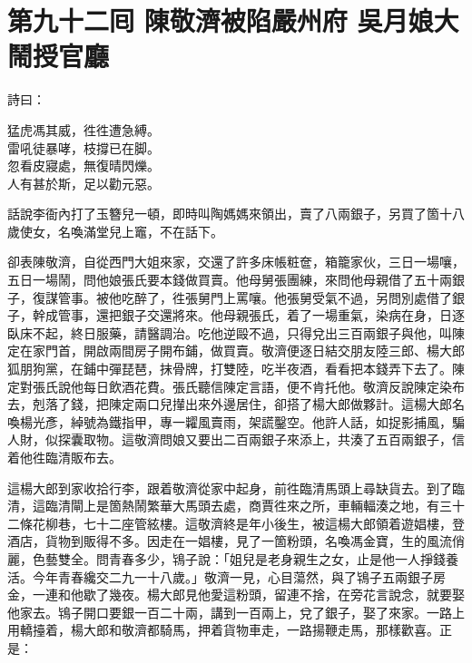 
\chapter*{第九十二囘 陳敬濟被陷嚴州府 吳月娘大鬧授官廳}


詩曰：

\begin{myquote}
猛虎馮其威，徃徃遭急縛。\\雷吼徒暴哮，枝撐已在脚。\\忽看皮寢處，無復晴閃爍。\\人有甚於斯，足以勸元惡。
\end{myquote}

話說李衙內打了玉簪兒一頓，即時叫陶媽媽來領出，賣了八兩銀子，另買了箇十八歲使女，名喚滿堂兒上竈，不在話下。

卻表陳敬濟，自從西門大姐來家，交還了許多床帳粧奩，箱籠家伙，三日一場嚷，五日一場鬧，問他娘張氏要本錢做買賣。他母舅張團練，來問他母親借了五十兩銀子，復謀管事。被他吃醉了，徃張舅門上罵嚷。{}他張舅受氣不過，另問別處借了銀子，幹成管事，還把銀子交還將來。他母親張氏，着了一場重氣，染病在身，日逐臥床不起，終日服藥，請醫調治。吃他逆毆不過，只得兌出三百兩銀子與他，叫陳定在家門首，開啟兩間房子開布鋪，做買賣。敬濟便逐日結交朋友陸三郎、楊大郎狐朋狗黨，在鋪中彈琵琶，抹骨牌，打雙陸，吃半夜酒，看看把本錢弄下去了。陳定對張氏說他每日飲酒花費。張氏聽信陳定言語，便不肯托他。敬濟反說陳定染布去，剋落了錢，把陳定兩口兒攆出來外邊居住，卻搭了楊大郎做夥計。這楊大郎名喚楊光彥，綽號為鐵指甲，專一糶風賣雨，{}架謊鑿空。他許人話，如捉影捕風，騙人財，似探囊取物。這敬濟問娘又要出二百兩銀子來添上，共湊了五百兩銀子，信着他徃臨清販布去。

這楊大郎到家收拾行李，跟着敬濟從家中起身，前徃臨清馬頭上尋缺貨去。到了臨清，這臨清閘上是箇熱鬧繁華大馬頭去處，商賈徃來之所，車輛輻湊之地，有三十二條花柳巷，七十二座管絃樓。這敬濟終是年小後生，被這楊大郎領着遊娼樓，登酒店，貨物到販得不多。因走在一娼樓，見了一箇粉頭，名喚馮金寶，生的風流俏麗，色藝雙全。問青春多少，鴇子說：「姐兒是老身親生之女，止是他一人掙錢養活。今年青春纔交二九一十八歲。」敬濟一見，心目蕩然，與了鴇子五兩銀子房金，一連和他歇了幾夜。楊大郎見他愛這粉頭，留連不捨，在旁花言說念，就要娶他家去。鴇子開口要銀一百二十兩，講到一百兩上，兌了銀子，娶了來家。一路上用轎擡着，楊大郎和敬濟都騎馬，押着貨物車走，一路揚鞭走馬，那樣歡喜。正是：

